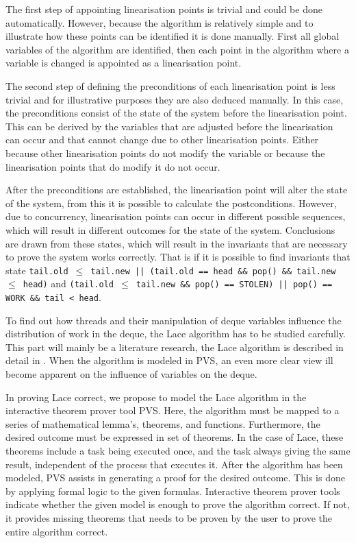 \documentclass{sig-alternate-br}
\begin{document}
The first step of appointing linearisation points is trivial and could be done automatically.
However, because the algorithm is relatively simple and to illustrate how these points can be identified it is done manually.
First all global variables of the algorithm are identified, then each point in the algorithm where a variable is changed is appointed as a linearisation point.

The second step of defining the preconditions of each linearisation point is less trivial and for illustrative purposes they are also deduced manually.
In this case, the preconditions consist of the state of the system before the linearisation point.
This can be derived by the variables that are adjusted before the linearisation can occur and that cannot change due to other linearisation points.
Either because other linearisation points do not modify the variable or because the linearisation points that do modify it do not occur.

After the preconditions are established, the linearisation point will alter the state of the system, from this it is possible to calculate the postconditions.
However, due to concurrency, linearisation points can occur in different possible sequences, which will result in different outcomes for the state of the system.
Conclusions are drawn from these states, which will result in the invariants that are necessary to prove the system works correctly.
That is if it is possible to find invariants that state \texttt{tail.old $\leq$ tail.new || (tail.old == head \&\& pop() \&\& tail.new $\leq$ head)} and \texttt{(tail.old $\leq$ tail.new \&\& pop() == STOLEN) || pop() == WORK \&\& tail < head}.

To find out how threads and their manipulation of deque variables influence the distribution of work in the deque, the Lace algorithm has to be studied carefully.
This part will mainly be a literature research, the Lace algorithm is described in detail in \cite{vanDijk2014206}.
When the algorithm is modeled in PVS, an even more clear view ill become apparent on the influence of variables on the deque.

In proving Lace correct, we propose to model the Lace algorithm in the interactive theorem prover tool PVS\cite{owre1992pvs}. 
Here, the algorithm must be mapped to a series of mathematical lemma's, theorems, and functions.
Furthermore, the desired outcome must be expressed in set of theorems.
In the case of Lace, these theorems include a task being executed once, and the task always giving the same result, independent of the process that executes it.
After the algorithm has been modeled, PVS assists in generating a proof for the desired outcome.
This is done by applying formal logic to the given formulas.
Interactive theorem prover tools indicate whether the given model is enough to prove the algorithm correct.
If not, it provides missing theorems that needs to be proven by the user to prove the entire algorithm correct.
\end{document}
